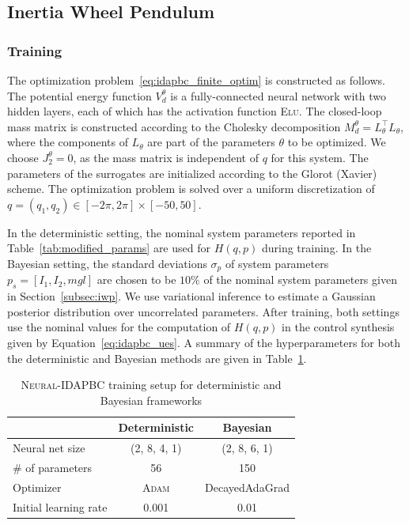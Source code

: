 \subsection{Inertia Wheel Pendulum}

\subsubsection{Training}
The optimization problem~\eqref{eq:idapbc_finite_optim} is constructed as
follows. The potential energy function $V_d^\theta$ is a fully-connected neural
network with two hidden layers, each of which has the activation function
\textsc{Elu}.
%
The closed-loop mass matrix is constructed according to the Cholesky
decomposition $M_d^\theta = L^\top_\theta L_\theta$, where the components of
$L_\theta$ are part of the parameters $\theta$ to be optimized.
%
We choose $J_2^\theta = 0$, as the mass matrix is independent of $q$ for
this system.
%
The parameters of the surrogates are initialized according to the Glorot
(Xavier)~\cite{glorot2010understanding} scheme.
%
The optimization problem is solved over a uniform discretization of $q = \left(
q_1, q_2 \right) \in [-2\pi, 2\pi] \times [-50, 50]$.


In the deterministic setting, the nominal system parameters reported in
Table~\ref{tab:modified_params} are used for $H(q,p)$ during training. 
%
In the Bayesian setting, the standard deviations $\sigma_{p}$ of system
parameters $p_s = [I_1, I_2, mgl]$ are chosen to be $10\%$ of the nominal system
parameters given in Section~\ref{subsec:iwp}.
%
We use variational inference to estimate a Gaussian posterior distribution
over uncorrelated parameters.
%
After training, both settings use the nominal values for the computation of
$H(q,p)$ in the control synthesis given by Equation~\eqref{eq:idapbc_ues}.
%
A summary of the hyperparameters for both the deterministic and Bayesian methods
are given in Table~\ref{tab:training_setup_idapbc}. 
\begin{table}[t]
    \centering
    \caption{\textsc{Neural-IDAPBC} training setup for deterministic and Bayesian frameworks}
    \begin{tabular}{lcc}
    \toprule
    & Deterministic & Bayesian \\
    \midrule
        Neural net size & (2, 8, 4, 1) & (2, 8, 6, 1)\\
        \# of parameters &  56  & 150\\
        Optimizer & \textsc{Adam} & DecayedAdaGrad\\
        Initial learning rate & 0.001 & 0.01\\
    \bottomrule
    \end{tabular}
    \label{tab:training_setup_idapbc}
\end{table}

